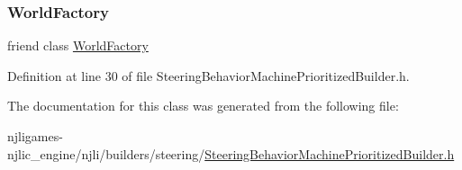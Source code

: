 \subsubsection{\texorpdfstring{World\+Factory}{WorldFactory}}
{\footnotesize\ttfamily friend class \mbox{\hyperlink{classnjli_1_1_world_factory}{World\+Factory}}\hspace{0.3cm}{\ttfamily [friend]}}



Definition at line 30 of file Steering\+Behavior\+Machine\+Prioritized\+Builder.\+h.



The documentation for this class was generated from the following file\+:\begin{DoxyCompactItemize}
\item 
njligames-\/njlic\+\_\+engine/njli/builders/steering/\mbox{\hyperlink{_steering_behavior_machine_prioritized_builder_8h}{Steering\+Behavior\+Machine\+Prioritized\+Builder.\+h}}\end{DoxyCompactItemize}
